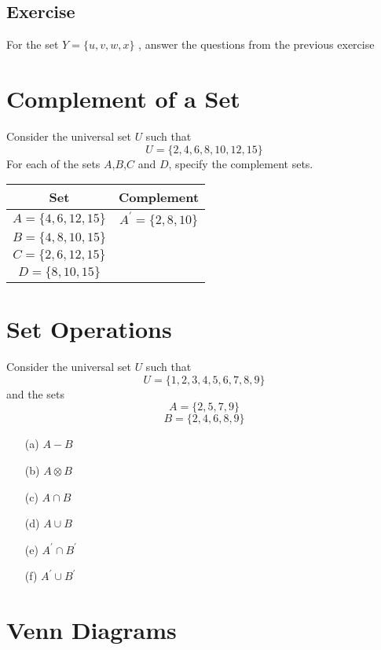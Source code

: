 \documentclass[MASTER.tex]{subfiles}
\begin{document}
\subsection*{Exercise}
For the set $Y = \{u,v,w,x\}$ , answer the questions from the
previous exercise



\section*{Complement of a Set}
Consider the universal set $U$ such that
\[U=\{2,4,6,8,10,12,15\} \]
For each of the sets $A$,$B$,$C$ and $D$, specify the complement sets.
\begin{center}
\begin{tabular}{|c|c|}
  \hline
Set & Complement\\
\hline $A=\{4,6,12,15\}$ &
$A^{\prime}=\{2,8,10\}$ \\ \hline $B=\{4,8,10,15\}$ & \\ \hline
$C=\{2,6,12,15\}$ & \\ \hline $D=\{8,10,15\}$ & \\ \hline

\end{tabular}
\end{center}



\section*{Set Operations}
Consider the universal set $U$ such that
\[U=\{1,2,3,4,5,6,7,8,9\} \] 
and the sets
\[A=\{2,5,7,9\} \] 
\[B=\{2,4,6,8,9\} \]

\begin{itemize}
\item[(a)] $A-B$
\item[(b)] $A \otimes B$
\item[(c)] $A \cap B$
\item[(d)] $A \cup B$
\item[(e)] $A^{\prime} \cap B^{\prime}$
\item[(f)] $A^{\prime} \cup B^{\prime}$
\end{itemize}


\section*{Venn Diagrams}
\end{document}
